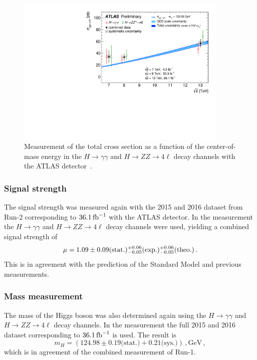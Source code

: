 \begin{figure}[htb]
    \centering
    \includegraphics[width=0.9\textwidth]{./figures/theory/total_xsec_run2.pdf}
    \caption{Measurement of the total cross section as a function of the center-of-mass energy in the $H \to \gamma\gamma$
             and $H \to ZZ \to 4\ell$ decay channels with the ATLAS detector~\cite{ATLAS-CONF-2017-047}.}\label{fig:theory:meas:run2:totalxsec}
\end{figure}

\subsubsection{Signal strength}\label{subsub:theory:meas:run2:mu}

The signal strength was measured again with the 2015 and 2016 dataset from Run-2 corresponding to $\SI{36.1}{\invfb}$ with the ATLAS detector.
In the measurement the $H\to\gamma\gamma$ and $H \to ZZ \to 4\ell$ decay channels were used,
yielding a combined signal strength of~\cite{ATLAS-CONF-2017-047}
\begin{equation}
    \mu = 1.09 \pm 0.09 \text{(stat.)} {}^{+{0.06}}_{-{0.05}} \text{(exp.)} {}^{+{0.06}}_{-{0.05}} \text{(theo.)} \,.
\end{equation}
This is in agreement with the prediction of the Standard Model and previous measurements.

\subsubsection{Mass measurement}\label{subsub:theory:meas:run2:mass}

The mass of the Higgs boson was also determined again using the $H\to\gamma\gamma$ and $H \to ZZ \to 4\ell$ decay channels.
In the measurement the full 2015 and 2016 dataset corresponding to $\SI{36.1}{\invfb}$ is used.
The result is~\cite{ATLAS-CONF-2017-046}
\begin{equation}
    m_H = (124.98 \pm 0.19 \text{(stat.)} + 0.21 \text{(sys.)}) \,, \text{GeV} \,,
\end{equation}
which is in agreement of the combined measurement of Run-1.
